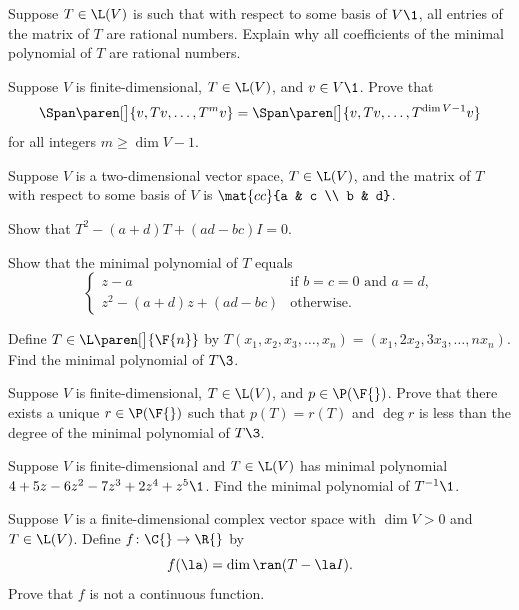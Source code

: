 \exercise
Suppose $T \in \L(V)$ is such that with respect to some basis of $V\1$, all entries of the matrix of $T$ are rational numbers. Explain why all coefficients of the minimal polynomial of $T$ are rational numbers.


\exercise
Suppose $V$ is finite-dimensional, $T \in \L(V)$, and $v \in V\1$. Prove that
\[
\Span\paren[\big]{ v, Tv, \ldots, T^m v} = \Span\paren[\big]{v, Tv, \ldots, T^{\dim V - 1}v}
\]
for all integers $m \ge \dim V - 1$.


\exercise
Suppose $V$ is a two-dimensional vector space, $T \in \L(V)$, and the matrix of $T$ with respect to some basis of $V$ is
$
\mat{cc}{a & c \\ b & d}$.\label{5minpoly}
\begin{subtheorem}
\item
Show that $T^2 - (a+d)T + (ad - bc)I = 0$.
\item
Show that the minimal polynomial of $T$ equals
\[
\begin{cases}
z-a &\text{if } b = c = 0 \text{ and } a = d, \\
z^2 - (a+d)z + (ad-bc) &\text{otherwise}.
\end{cases}
\]
\end{subtheorem}
\exercisesubtheoremend


\exercise
Define $T \in \L\paren[\big]{\F{n}}$ by
$
T(x_1, x_2, x_3, \dots, x_n) = (x_1, 2x_2, 3x_3, \dots, n x_n)$.
Find the minimal polynomial of $T\3$.


\exercise
Suppose $V$ is finite-dimensional, $T \in \L(V)$, and $p \in \P(\F{})$. Prove that there exists a unique $r \in \P(\F{})$ such that $p(T) = r(T)$ and $\deg r$ is less than the degree of the minimal polynomial of $T\3$.


\exercise
Suppose $V$ is finite-dimensional and $T \in \L(V)$ has minimal polynomial $4 + 5z - 6z^2 - 7z^3 + 2 z^4 + z^5\1$. Find the minimal polynomial of $T^{-1}\1$.


\exercise
Suppose $V$ is a finite-dimensional complex vector space with $\dim V > 0$ and $T \in \L(V)$. Define $f \colon \C{} \to \R{}$ by
\[
f(\la) = \dim \ran (T - \la I).
\]
Prove that $f$ is not a continuous function.


